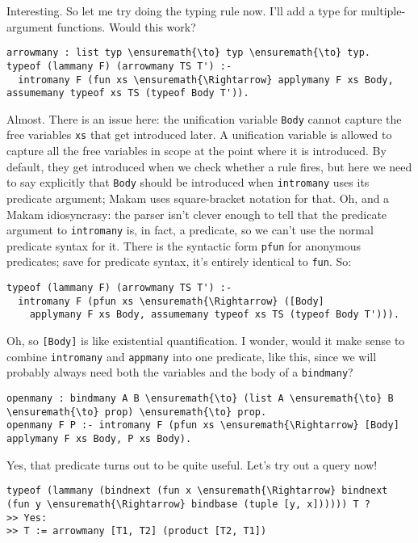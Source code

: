 \heroSTUDENT{} Interesting. So let me try doing the typing rule now. I'll add
a type for multiple-argument functions. Would this work?

\begin{verbatim}
arrowmany : list typ \ensuremath{\to} typ \ensuremath{\to} typ.
typeof (lammany F) (arrowmany TS T') :-
  intromany F (fun xs \ensuremath{\Rightarrow} applymany F xs Body, assumemany typeof xs TS (typeof Body T')).
\end{verbatim}

\heroADVISOR{} Almost. There is an issue here: the unification variable
\texttt{Body} cannot capture the free variables \texttt{xs} that get
introduced later. A unification variable is allowed to capture all the
free variables in scope at the point where it is introduced. By default,
they get introduced when we check whether a rule fires, but here we need
to say explicitly that \texttt{Body} should be introduced when
\texttt{intromany} uses its predicate argument; Makam uses
square-bracket notation for that. Oh, and a Makam idiosyncrasy: the
parser isn't clever enough to tell that the predicate argument to
\texttt{intromany} is, in fact, a predicate, so we can't use the normal
predicate syntax for it. There is the syntactic form \texttt{pfun} for
anonymous predicates; save for predicate syntax, it's entirely identical
to \texttt{fun}. So:

\begin{verbatim}
typeof (lammany F) (arrowmany TS T') :-
  intromany F (pfun xs \ensuremath{\Rightarrow} ([Body]
    applymany F xs Body, assumemany typeof xs TS (typeof Body T'))).
\end{verbatim}

\heroSTUDENT{} Oh, so \texttt{{[}Body{]}} is like existential quantification.
I wonder, would it make sense to combine \texttt{intromany} and
\texttt{appmany} into one predicate, like this, since we will probably
always need both the variables and the body of a \texttt{bindmany}?

\begin{verbatim}
openmany : bindmany A B \ensuremath{\to} (list A \ensuremath{\to} B \ensuremath{\to} prop) \ensuremath{\to} prop.
openmany F P :- intromany F (pfun xs \ensuremath{\Rightarrow} [Body] applymany F xs Body, P xs Body).
\end{verbatim}

\heroADVISOR{} Yes, that predicate turns out to be quite useful. Let's try out
a query now!

\begin{verbatim}
typeof (lammany (bindnext (fun x \ensuremath{\Rightarrow} bindnext (fun y \ensuremath{\Rightarrow} bindbase (tuple [y, x]))))) T ?
>> Yes:
>> T := arrowmany [T1, T2] (product [T2, T1])
\end{verbatim}

